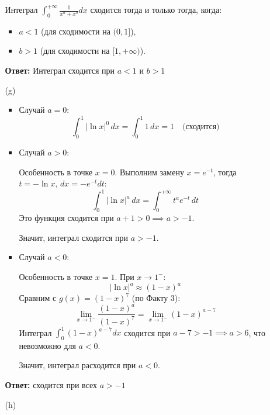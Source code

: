 \documentclass[a4paper]{article}
\begin{document}
\begin{enumerate}
\begin{enumerate}
    Интеграл \(\int_{0}^{+\infty} \frac{1}{x^a + x^b} dx\) сходится
    тогда и только тогда, когда:
    \begin{itemize}
    \item 
    \(a < 1\) (для сходимости на \((0, 1]\)),
    \item
    \(b > 1\) (для сходимости на \([1, +\infty)\)).
    \end{itemize}

    \textbf{Ответ: } Интеграл сходится при  \(a < 1\)  и  \(b>1\) \\

    \item[(g)]\begin{itemize}
      \item Случай \(a = 0\):
      \[
      \int_{0}^{1} |\ln x|^0 \, dx = \int_{0}^{1} 1 \, dx = 1 \quad \text{(сходится)}
      \]
      \item Случай \(a > 0\):
      
       Особенность в точке \(x = 0\). Выполним замену \(x = e^{-t}\),
        тогда \(t = -\ln x\), \(dx = -e^{-t} dt\):  
      \[
      \int_{0}^{1} |\ln x|^a \, dx = \int_{0}^{+\infty} t^a e^{-t} \, dt
      \]  
      Это функция  сходится при
       \(a + 1 > 0 \implies a > -1\).  
      
       Значит, интеграл сходится при \(a > -1\).

      \item Случай \(a < 0\):
      
      Особенность в точке \(x = 1\). При \(x \to 1^-\):  
      \[
      |\ln x|^a \approx (1 - x)^a
      \]  
      Сравним с \(g(x) = (1 - x)^7\) (по Факту 3):  
      \[
      \lim_{x \to 1^-} \frac{(1 - x)^a}{(1 - x)^7} = \lim_{x \to 1^-} (1 - x)^{a - 7}
      \]  
      Интеграл \(\int_{0}^{1} (1 - x)^{a - 7} dx\) сходится при 
      \(a - 7 > -1 \implies a > 6\), что невозможно для \(a < 0\).  
      
      Значит, интеграл расходится при \(a < 0\). 
    \end{itemize}
    \textbf{Ответ: } сходится при всех $a > -1$\\ 

    \item[(h)]
  \end{enumerate}
  
  
\end{enumerate}
\end{document}
